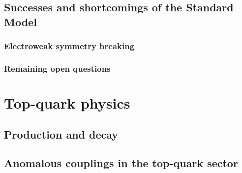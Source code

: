 \subsection{Successes and shortcomings of the Standard Model} \label{sec::SuccessAndFailSM}
\subsubsection{Electroweak symmetry breaking}

\subsubsection{Remaining open questions}

\section{Top-quark physics}

\subsection{Production and decay}

\subsection{Anomalous couplings in the top-quark sector}
